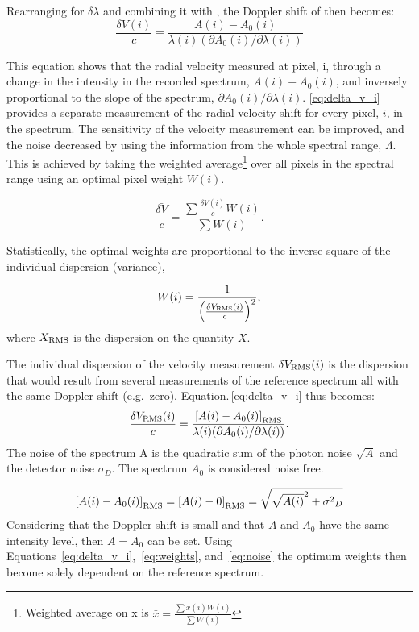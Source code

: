 Rearranging  for \(\delta \lambda\) and combining it with , the Doppler shift of then becomes:
\begin{equation}
    \frac{\delta V(i)}{c} = \frac{A(i) - A_0(i) }{\lambda(i) (\partial A_0(i)/\partial \lambda(i))} \label{eq:delta_v_i}
\end{equation}

This equation shows that the radial velocity measured at pixel, i, through a change in the intensity in the recorded spectrum, \(A(i)-A_0(i)\), and inversely proportional to the slope of the spectrum, \({\partial A_0(i)}/{\partial \lambda(i)}\).
\ref{eq:delta_v_i} provides a separate measurement of the radial velocity shift for every pixel, $i$, in the spectrum. The sensitivity of the velocity measurement can be improved, and the noise decreased by using the information from the whole  spectral range, \(\Lambda\). This is achieved by taking the weighted average\footnote{Weighted average on x is \(\bar{x} = \frac{\sum{ x(i)W(i)}}{\sum {W(i)}}\)} over all pixels in the spectral range using an optimal pixel weight \(W(i)\).

\begin{equation}
\bar{\frac{\delta V}{c}} = \frac{\sum{\frac{\delta V(i)}{c}W(i)}}{\sum {W(i)}}.
\end{equation}

Statistically, the optimal weights are proportional to the inverse square of the individual dispersion (variance),

\begin{equation}
W(i) = \frac{1}{{\left(\frac{\delta V_{\textrm{RMS}}(i)}{c}\right)}^{2}}, \label{eq:weights}
\end{equation}
where \(X_{\textrm{RMS}}\) is the dispersion on the quantity \(X\).


The individual dispersion of the velocity measurement \(\delta V_{\textrm{RMS}}(i)\) is the dispersion that would result from several measurements of the reference spectrum all with the same Doppler shift (e.g.\ zero). Equation.\,\ref{eq:delta_v_i} thus becomes:
\begin{equation}
    \frac{\delta V_{\textrm{RMS}}(i)}{c} = \frac{{[A(i) - A_0(i)]}_{\textrm{RMS}} }{\lambda(i) (\partial A_0(i)/\partial \lambda(i))}. \label{eq:delta_v_i_rms}
\end{equation}
The noise of the spectrum A is the quadratic sum of the photon noise \(\sqrt{A}\) and the detector noise \(\sigma_D\). The spectrum \(A_0\) is considered noise free.

\begin{equation}
{[{A(i)-A_0(i)}]}_{\textrm{RMS}} = {[{A(i)} - 0]}_{\textrm{RMS}} = \sqrt{{\sqrt{A(i)}}^{2} + {\sigma^{2}}_{D}} \label{eq:noise}
\end{equation}
Considering that the Doppler shift is small and that \(A\) and \(A_0\) have the same intensity level, then \(A = A_0\) can be set. Using Equations~\ref{eq:delta_v_i},~\ref{eq:weights}, and~\ref{eq:noise} the optimum weights then become solely dependent on the reference spectrum.

